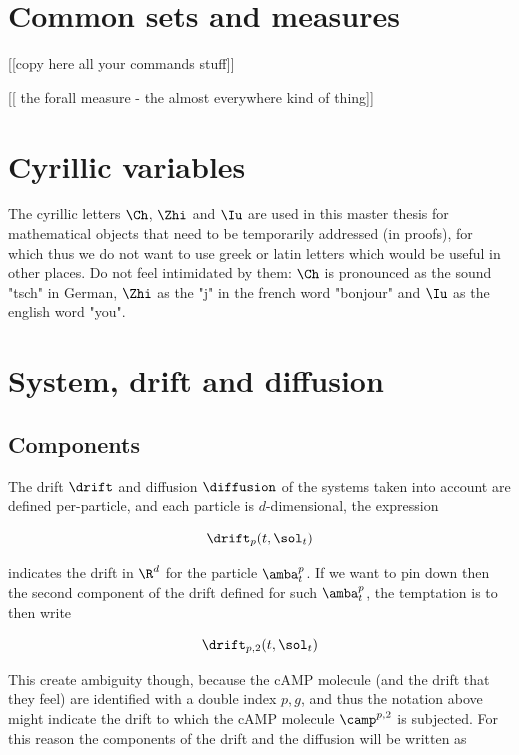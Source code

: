 \label{app:notation}

\section{Common sets and measures}

[[copy here all your commands stuff]]

[[ the forall measure - the almost everywhere kind of thing]]

\section{Cyrillic variables}

The cyrillic letters $\Ch$, $\Zhi$ and $\Iu$ are used in this master thesis for mathematical objects that need to be temporarily addressed (\eg in proofs), for which thus we do not want to use greek or latin letters which would be useful in other places.
Do not feel intimidated by them: $\Ch$ is pronounced as the sound "tsch" in German, $\Zhi$ as the "j" in the french word "bonjour" and $\Iu$ as the english word "you".

\section{System, drift and diffusion}

\subsection{Components}

The drift $\drift$ and diffusion $\diffusion$ of the systems taken into account are defined per-particle, and each particle is $d$-dimensional, \eg the expression 

\begin{equation*}
	\drift_{p}(t, \sol_t)
\end{equation*}

indicates the drift in $\R^d$ for the particle $\amba_t^p$.
If we want to pin down then the second component of the drift defined for such $\amba_t^p$, the temptation is to then write

\begin{equation*}
	\drift_{p,2}(t, \sol_t)
\end{equation*}

This create ambiguity though, because the cAMP molecule (and the drift that they feel) are identified with a double index $p,g$, and thus the notation above might indicate the drift to which the cAMP molecule $\camp^{p,2}$ is subjected.
For this reason the components of the drift and the diffusion will be written as 

